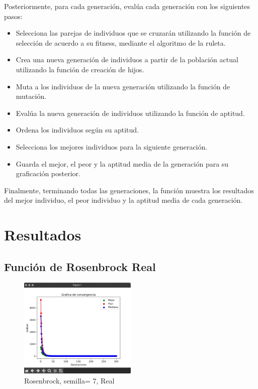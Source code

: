 \documentclass{report}
\begin{document}
    Posteriormente, para cada generación, evalúa cada generación con los siguientes pasos:
    \begin{itemize}
        \item Selecciona las parejas de individuos que se cruzarán utilizando la función de selección de acuerdo a su fitness, mediante el algoritmo de la ruleta.
        \item Crea una nueva generación de individuos a partir de la población actual utilizando la función de creación de hijos.
        \item Muta a los individuos de la nueva generación utilizando la función de mutación.
        \item Evalúa la nueva generación de individuos utilizando la función de aptitud.
        \item Ordena los individuos según su aptitud.
        \item Selecciona los mejores individuos para la siguiente generación.
        \item Guarda el mejor, el peor y la aptitud media de la generación para su graficación posterior.
    \end{itemize}

    Finalmente, terminando todas las generaciones, la función muestra los resultados del mejor individuo, el peor individuo y la aptitud media de cada generación.

    \newpage

    \section*{Resultados}
    \subsection*{Función de Rosenbrock Real}
    \begin{figure}[H]
        \centering
        \includegraphics[width=0.5\textwidth]{rosenbrock_7_re.jpeg}
        \caption{Rosenbrock, semilla= 7, Real}
    \end{figure}
\end{document}
